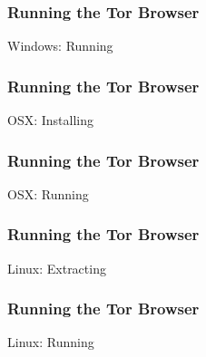 \documentclass{beamer}
\begin{document}
\begin{frame}
\frametitle{Running the Tor Browser}
	\begin{block}{Windows: Running}
	\center
	\end{block}
\end{frame}

\begin{frame}
\frametitle{Running the Tor Browser}
        \begin{block}{OSX: Installing}
	\center
	\end{block}
\end{frame}

\begin{frame}
\frametitle{Running the Tor Browser}
	\begin{block}{OSX: Running}
		\center	
	\end{block}
\end{frame}

\begin{frame}
\frametitle{Running the Tor Browser}
        \begin{block}{Linux: Extracting}
		\center
        \end{block}
\end{frame}

\begin{frame}
\frametitle{Running the Tor Browser}
        \begin{block}{Linux: Running}
	\center
	\end{block}
\end{frame}
\end{document}
